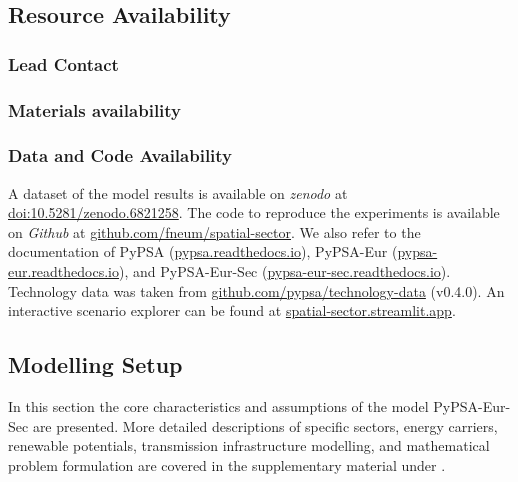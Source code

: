 \subsection*{Resource Availability}

\subsubsection*{Lead Contact}

\subsubsection*{Materials availability}

\subsubsection*{Data and Code Availability}

A dataset of the model results is available on \textit{zenodo} at \href{https://doi.org/10.5281/zenodo.6821258}{doi:10.5281/zenodo.6821258}.
The code to reproduce the experiments is available on \textit{Github} at \href{https://github.com/fneum/spatial-sector}{github.com/fneum/spatial-sector}.
We also refer to the documentation of PyPSA (\href{https://pypsa.readthedocs.io}{pypsa.readthedocs.io}),
PyPSA-Eur (\href{https://pypsa-eur.readthedocs.io}{pypsa-eur.readthedocs.io}), and
PyPSA-Eur-Sec (\href{https://pypsa-eur-sec.readthedocs.io}{pypsa-eur-sec.readthedocs.io}).
Technology data was taken from \href{https://github.com/pypsa/technology-data}{github.com/pypsa/technology-data} (v0.4.0).
An interactive scenario explorer can be found at \href{https://spatial-sector.streamlit.app}{spatial-sector.streamlit.app}.

\subsection*{Modelling Setup}

In this section the core characteristics and assumptions of the model
PyPSA-Eur-Sec are presented. More detailed descriptions of specific sectors,
energy carriers, renewable potentials, transmission infrastructure modelling,
and mathematical problem formulation are covered in the supplementary material
under .

